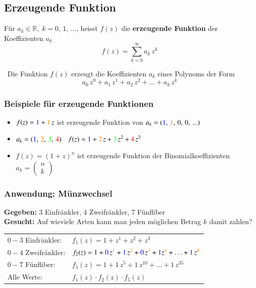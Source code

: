 \subsection{Erzeugende Funktion}

Für $a_k \in \mathbb{R}, \; k = 0, \, 1, \, ...$, heisst $f(z)$ die \textbf{erzeugende Funktion} der Koeffizienten $a_k$
$$ f(z) = \sum\limits_{k=0}^\infty a_k \, z^k $$

\textrightarrow\ Die Funktion $f(z)$ erzeugt die Koeffizienten $a_k$ eines Polynoms der Form
$$ a_0 \, z^0 + a_1 \, z^1 + a_2 \, z^2 + ... + a_k \, z^k $$ 


\subsubsection{Beispiele für erzeugende Funktionen}

\begin{itemize}
	\setlength\itemsep{0.75em}
	\item $f(z) = {\color{blue}1} + {\color{orange}1} \, z$ ist erzeugende Funktion von $a_k = ({\color{blue}1}, \, {\color{orange}1}, \,0, \,0, \, ...)$
	\item $a_k = ({\color{blue}1}, \, {\color{orange}2}, \, {\color{green}3}, \, {\color{red}4})$ \textrightarrow\  $f(z) = {\color{blue}1} + {\color{orange}2} \, z + {\color{green}3} \, z^2 + {\color{red}4} \, z^3$
	\item $f(z) = (1 + z)^n$ ist erzeugende Funktion der Binomialkoeffizienten $a_k = \begin{pmatrix} n\\k \end{pmatrix}$
\end{itemize}


\vfill\null
\columnbreak


\subsubsection*{Anwendung: Münzwechsel}

\textbf{Gegeben:} 3 Einfränkler, 4 Zweifränkler, 7 Fünfliber \\
\textbf{Gesucht:} Auf wieviele Arten kann man jeden möglichen Betrag $k$ damit zahlen?

\vspace{0.2cm}

\begin{tabular}{ll}
	$0-3$ Einfränkler:	& $f_1(z) = 1 + z^1 + z^2 + z^3$ \\	
	$0-4$ Zweifränkler: & $f_2(z) = 1 + {\color{blue}0} \, z^{{\color{orange}1}} + {\color{blue}1} \, z^{{\color{orange}2}} + {\color{blue}0} \, z^{{\color{orange}3}} + {\color{blue}1} z^{{\color{orange}4}} + \ldots + {\color{blue}1} \, z^{{\color{orange}8}}$ \\	
	$0-7$ Fünfliber: 	& $f_5(z) =  1 + 1 \, z^5 + 1 \, z^{10} + \ldots + 1 \, z^{35} $ \\	
	Alle Werte: 		& $f_1(z) \cdot f_2(z) \cdot f_5(z)$
\end{tabular}

